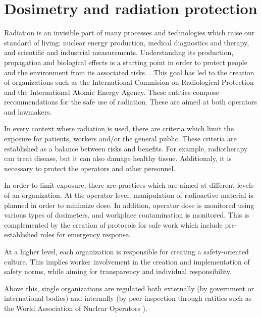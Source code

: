 \section{Dosimetry and radiation protection}
Radiation is an invisible part of many processes
and technologies which raise our standard of living:
nuclear energy production, medical diagnostics and therapy,
and scientific and industrial measurements.
Understanding its production, propagation and biological effects
is a starting point in order to protect people and the environment
from its associated risks.
\cite{iaea_radiation_????}.
This goal has led to the creation of organizations such as the
International Commision on Radiological Protection
\cite{_icrp_????} and the International Atomic Energy
Agency\cite{iaea_official_????}.
These entities compose recommendations for the safe use of radiation.
These are aimed at both operators and lawmakers.

In every context where radiation is used,
there are criteria which limit the exposure for
patients, workers and/or the general public.
These criteria are established as a balance between risks and benefits.
For example, radiotherapy can treat disease,
but it can also damage healthy tissue.
Additionaly, it is necessary to protect the operators and other personnel.

In order to limit exposure, 
there are practices which are aimed at different levels of an organization.
At the operator level,
manipulation of radioactive material is planned in order to minimize dose.
In addition, operator dose is monitored using various types of dosimeters,
and workplace contamination is monitored.
This is complemented by the creation of protocols for safe work
which include pre-established roles for emergency response.

At a higher level, each organization is responsible for creating a safety-oriented culture.
This implies worker involvement in the creation and implementation of safety norms,
while aiming for transparency and individual responsibility.

Above this, single organizations are regulated both externally
(by government or international bodies)
and internally (by peer inspection through entities such as the
World Association of Nuclear Operators
\cite{washington_practice_1997}).
